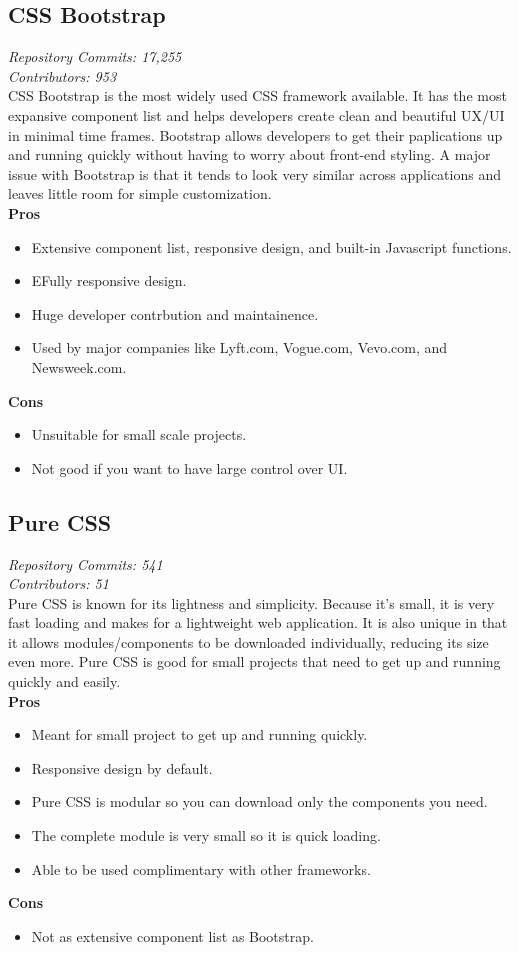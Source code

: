 \documentclass[onecolumn, draftclsnofoot,10pt, compsoc]{IEEEtran}
\begin{document}
\subsection{CSS Bootstrap}
\textit{Repository Commits: 17,255}\\ 
\textit{Contributors: 953}\\
CSS Bootstrap is the most widely used CSS framework available. It has the most expansive component list and helps developers create clean and beautiful UX/UI in minimal time frames. Bootstrap allows developers to get their paplications up and running quickly without having to worry about front-end styling. A major issue with Bootstrap is that it tends to look very similar across applications and leaves little room for simple customization.\\
\textbf{Pros}
\begin{itemize}
    \item Extensive component list, responsive design, and built-in Javascript functions.\cite{puranjay_2015}
    \item EFully responsive design.
    \item Huge developer contrbution and maintainence.
    \item Used by major companies like Lyft.com, Vogue.com, Vevo.com, and Newsweek.com. \cite{puranjay_2015}
\end{itemize}
\textbf{Cons}
\begin{itemize}
    \item Unsuitable for small scale projects. \cite{puranjay_2015}
    \item Not good if you want to have large control over UI.
    
\end{itemize}
\subsection{Pure CSS}
\textit{Repository Commits: 541}\\ 
\textit{Contributors: 51}\\
Pure CSS is known for its lightness and simplicity. Because it's small, it is very fast loading and makes for a lightweight web application. It is also unique in that it allows modules/components to be downloaded individually, reducing its size even more. Pure CSS is good for small projects that need to get up and running quickly and easily.\\
\textbf{Pros}
\begin{itemize}
    \item Meant for small project to get up and running quickly.
    \item Responsive design by default.
    \item Pure CSS is modular so you can download only the components you need.
    \item The complete module is very small so it is quick loading.
    \item Able to be used complimentary with other frameworks.
\end{itemize}
\textbf{Cons} 
\begin{itemize}
    \item Not as extensive component list as Bootstrap.
\end{itemize}
\end{document}
